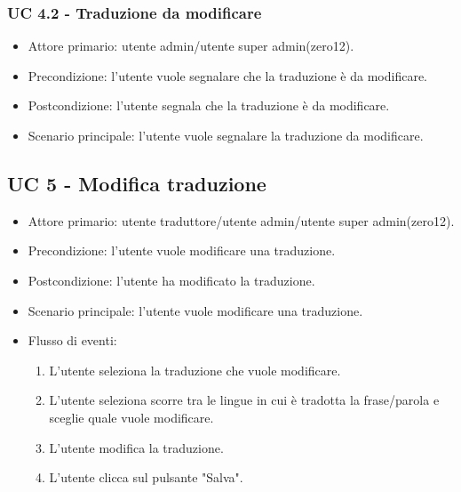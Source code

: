     \subsubsection{UC 4.2 - Traduzione da modificare}
        \begin{itemize}
            \item Attore primario: utente admin/utente super admin(zero12).
            \item Precondizione: l'utente vuole segnalare che la traduzione è da modificare.
            \item Postcondizione: l'utente segnala che la traduzione è da modificare.
            \item Scenario principale: l'utente vuole segnalare la traduzione da modificare.
        \end{itemize}
\subsection{UC 5 - Modifica traduzione}
    \begin{itemize}
        \item Attore primario: utente traduttore/utente admin/utente super admin(zero12).
        \item Precondizione: l'utente vuole modificare una traduzione.
        \item Postcondizione: l'utente ha modificato la traduzione.
        \item Scenario principale: l'utente vuole modificare una traduzione.
        \item Flusso di eventi:
            \begin{enumerate}
                \item L'utente seleziona la traduzione che vuole modificare.
                \item L'utente seleziona scorre tra le lingue in cui è tradotta la frase/parola e sceglie quale vuole modificare.
                \item L'utente modifica la traduzione.
                \item L'utente clicca sul pulsante "Salva".
            \end{enumerate}
    \end{itemize}
